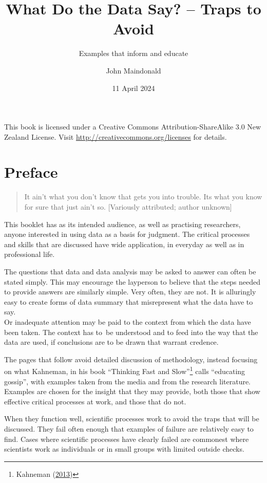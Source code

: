 \documentclass[
  10ptls,
  b5paper]{book}
\title{What Do the Data Say? -- Traps to Avoid}
\subtitle{Examples that inform and educate}
\author{John Maindonald}
\date{11 April 2024}
\begin{document}
\maketitle

\newpage
This book is licensed under a Creative
Commons Attribution-ShareAlike 3.0 New Zealand License.
Visit \url{http://creativecommons.org/licenses} for details.


{
\hypersetup{linkcolor=}
\setcounter{tocdepth}{1}
\tableofcontents
}
\renewcommand{\bibname}{References}

\hypertarget{preface}{%
\chapter*{Preface}\label{preface}}

\begin{quote}
It ain't what you don't know that gets you into trouble.
Its what you know for sure that just ain't so.
{[}Variously attributed; author unknown{]}
\end{quote}

This booklet has as its intended audience, as well as practising
researchers, anyone interested in using data as a basis for
judgment. The critical processes and skills that are discussed
have wide application, in everyday as well as in professional life.

The questions that data and data analysis may be asked to answer can
often be stated simply. This may encourage the layperson to believe
that the steps needed to provide answers are similarly simple.
Very often, they are not. It is alluringly easy to create forms of
data summary that misrepresent what the data have to say.\\
Or inadequate attention may be paid to the context from which the
data have been taken. The context has to~be understood and to feed
into the way that the data are used, if conclusions are to be drawn
that warrant credence.

The pages that follow avoid detailed discussion of methodology,
instead focusing on what Kahneman, in his book
``Thinking Fast and Slow''\footnote{Kahneman (\protect\hyperlink{ref-kahneman_2013}{2013})} calls ``educating gossip'',
with examples taken from the media and from the research literature.
Examples are chosen for the insight that they may provide, both
those that show effective critical processes at work, and those
that do not.

When they function well, scientific processes work to avoid the
traps that will be discussed. They fail often enough that examples
of failure are relatively easy to find. Cases where scientific
processes have clearly failed are commonest where scientists work
as individuals or in small groups with limited outside checks.
\end{document}
